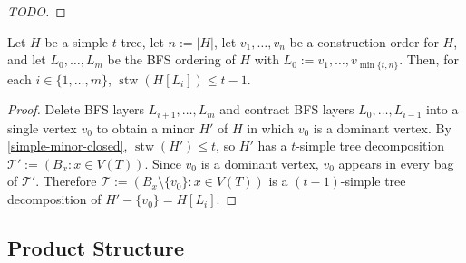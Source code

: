 \documentclass[kpfonts]{patmorin}
\DeclareMathOperator{\stw}{stw}
\theoremstyle{named}
\begin{document}
\begin{proof}
    [TODO]
\end{proof}

\begin{clm}\label{simple-bfs-layers}
    Let $H$ be a simple $t$-tree, let $n:=|H|$, let $v_1,\ldots,v_n$ be a construction order for $H$, and let $L_0,\ldots,L_m$ be the BFS ordering of $H$ with $L_0:=v_1,\ldots,v_{\min\{t,n\}}$.   Then, for each $i\in\{1,\ldots,m\}$, $\stw(H[L_i])\le t-1$.
\end{clm}

\begin{proof}
    Delete BFS layers $L_{i+1},\ldots,L_m$ and contract BFS layers $L_0,\ldots,L_{i-1}$ into a single vertex $v_0$ to obtain a minor $H'$ of $H$ in which $v_0$ is a dominant vertex.  By \cref{simple-minor-closed}, $\stw(H')\le t$, so $H'$ has a $t$-simple tree decomposition $\mathcal{T}':=(B_x:x\in V(T))$.  Since $v_0$ is a dominant vertex, $v_0$ appears in every bag of $\mathcal{T}'$.  Therefore $\mathcal{T}:=(B_x\setminus\{v_0\}:x\in V(T))$ is a $(t-1)$-simple tree decomposition of $H'-\{v_0\}=H[L_i]$.
\end{proof}


\subsection{Product Structure}
\end{document}

